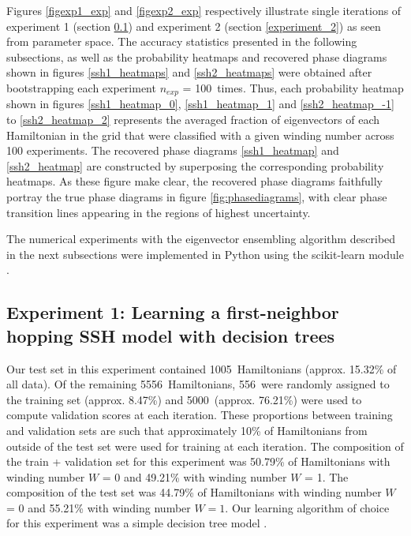 \documentclass[10pt]{revtex4-1}
\newcommand\nExp{100}   %
\newcommand\sshOneTestNHam{1005}
\newcommand\sshOneTestFracHam{15.32}
\newcommand\sshOneTrainPlusValNHam{5556}
\newcommand\sshOneTrainNHam{556}
\newcommand\sshOneTrainFracHam{8.47}
\newcommand\sshOneValNHam{5000}
\newcommand\sshOneValFracHam{76.21}
\newcommand\sshOneTrainPlusValWindZeroFracHam{50.79}
\newcommand\sshOneTrainPlusValWindOneFracHam{49.21}
\newcommand\sshOneTestWindZeroFracHam{44.79}
\newcommand\sshOneTestWindOneFracHam{55.21}
\begin{document}
Figures \ref{figexp1_exp} and \ref{figexp2_exp} respectively illustrate single iterations of experiment 1 (section \ref{experiment_1}) and experiment 2 (section \ref{experiment_2}) as seen from parameter space. The accuracy statistics presented in the following subsections, as well as the probability heatmaps and recovered phase diagrams shown in figures \ref{ssh1_heatmaps} and \ref{ssh2_heatmaps} were obtained after bootstrapping each experiment $n_{exp}$ = \nExp\ times. Thus, each probability heatmap shown in figures \ref{ssh1_heatmap_0}, \ref{ssh1_heatmap_1} and \ref{ssh2_heatmap_-1} to \ref{ssh2_heatmap_2} represents the averaged fraction of eigenvectors of each Hamiltonian in the grid that were classified with a given winding number across 100 experiments. The recovered phase diagrams \ref{ssh1_heatmap} and \ref{ssh2_heatmap} are constructed by superposing the corresponding probability heatmaps. As these figure make clear, the recovered phase diagrams faithfully portray the true phase diagrams in figure \ref{fig:phasediagrams}, with clear phase transition lines appearing in the regions of highest uncertainty.

The numerical experiments with the eigenvector ensembling algorithm described in the next subsections were implemented in Python using the scikit-learn module \cite{scikit-learn,sklearn_api}. 

\subsection{Experiment 1: Learning a first-neighbor hopping SSH model with decision trees}
\label{experiment_1}
Our test set in this experiment contained \sshOneTestNHam\ Hamiltonians (approx. \sshOneTestFracHam\% of all data). Of the remaining \sshOneTrainPlusValNHam\ Hamiltonians, \sshOneTrainNHam\ were randomly assigned to the training set (approx. \sshOneTrainFracHam\%) and \sshOneValNHam\ (approx. \sshOneValFracHam\%) were used to compute validation scores at each iteration. These proportions between training and validation sets are such that approximately 10\%  of Hamiltonians from outside of the test set were used for training at each iteration. The composition of the train + validation set for this experiment was \sshOneTrainPlusValWindZeroFracHam\% of Hamiltonians with winding number $W$ = 0 and \sshOneTrainPlusValWindOneFracHam\% with winding number $W$ = 1. The composition of the test set was \sshOneTestWindZeroFracHam\% of Hamiltonians with winding number $W$ = 0 and \sshOneTestWindOneFracHam\% with winding number $W=1$. Our learning algorithm of choice for this experiment was a simple decision tree model \cite{breiman2017classification}.
\end{document}
